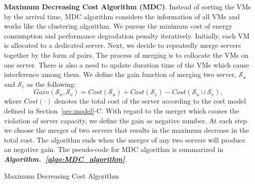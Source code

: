 \documentclass[10pt,journal]{IEEEtran}
\begin{document}
\textbf{Maximum Decreasing Cost Algorithm (MDC)}. Instead of sorting the VMs by the arrival time, MDC algorithm considers the information of all VMs and works like the clustering algorithm. We pursue the minimum cost of energy consumption and performance degradation penalty iteratively. Initially, each VM is allocated to a dedicated server. Next, we decide to repeatedly merge servers together by the form of pairs. The process of merging is to collocate the VMs on one server. There is also a need to update duration time of the VMs which cause interference among them. We define the gain function of merging two server, $\mathcal{S}_u$ and $\mathcal{S}_v$ as the following:
\begin{equation}
Gain(\mathcal{S}_u,\mathcal{S}_v)=Cost(\mathcal{S}_u)+Cost(\mathcal{S}_v)-Cost(\mathcal{S}_u{\cup}\mathcal{S}_v),
\end{equation}
where $Cost(\cdot)$ denotes the total cost of the server according to the cost model defined in Section~\ref{sec:model}-C. With regard to the merger which causes the violation of server capacity, we define the gain as negative number. At each step we choose the merger of two servers that results in the maximum decrease in the total cost. The algorithm ends when the merger of any two servers will produce an negative gain. The pseudo-code for MDC algorithm is summarized in \textbf{\textit{Algorithm.~\ref{algo:MDC_algorithm}}}.
\begin{algorithm}
\caption{\label{algo:MDC_algorithm}Maximum Decreasing Cost Algorithm}
\end{algorithm}
\end{document}
